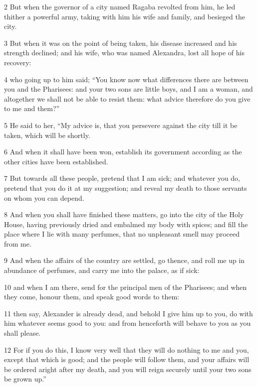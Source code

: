 \par 2 But when the governor of a city named Ragaba revolted from him, he led thither a powerful army, taking with him his wife and family, and besieged the city. 

\par 3 But when it was on the point of being taken, his disease increased and his strength declined; and his wife, who was named Alexandra, lost all hope of his recovery: 

\par 4 who going up to him said; “You know now what differences there are between you and the Pharisees: and your two sons are little boys, and I am a woman, and altogether we shall not be able to resist them: what advice therefore do you give to me and them?” 

\par 5 He said to her, “My advice is, that you persevere against the city till it be taken, which will be shortly. 

\par 6 And when it shall have been won, establish its government according as the other cities have been established. 

\par 7 But towards all these people, pretend that I am sick; and whatever you do, pretend that you do it at my suggestion; and reveal my death to those servants on whom you can depend. 

\par 8 And when you shall have finished these matters, go into the city of the Holy House, having previously dried and embalmed my body with spices; and fill the place where I lie with many perfumes, that no unpleasant smell may proceed from me. 

\par 9 And when the affairs of the country are settled, go thence, and roll me up in abundance of perfumes, and carry me into the palace, as if sick: 

\par 10 and when I am there, send for the principal men of the Pharisees; and when they come, honour them, and speak good words to them: 

\par 11 then say, Alexander is already dead, and behold I give him up to you, do with him whatever seems good to you: and from henceforth will behave to you as you shall please. 

\par 12 For if you do this, I know very well that they will do nothing to me and you, except that which is good; and the people will follow them, and your affairs will be ordered aright after my death, and you will reign securely until your two sons be grown up.” 

